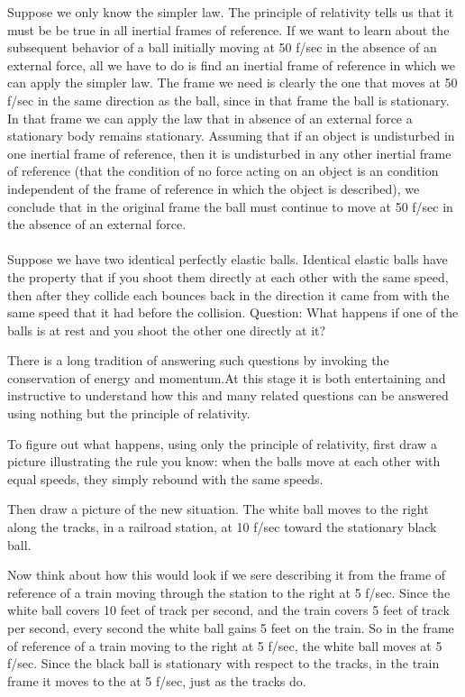 Suppose we only know the simpler law. The principle of relativity tells us that it must be be true in all inertial frames of reference. If we want to learn about the subsequent behavior of a ball initially moving at 50 f/sec in the absence of an external force, all we have to do is find an inertial frame of reference in which we can apply the simpler law. The frame we need is clearly the one that moves at 50 f/sec in the same direction as the ball, since in that frame the ball is stationary. In that frame we can apply the law that in absence of an external force a stationary body remains stationary. Assuming that if an object is undisturbed in one inertial frame of reference, then it is undisturbed in any other inertial frame of reference (that the condition of no force acting on an object is an  condition independent of the frame of reference in which the object is described), we conclude that in the original frame the ball must continue to move at 50 f/sec in the absence of an external force. 
\\\\
Suppose we have two identical perfectly elastic balls. Identical elastic balls have the property that if you shoot them directly at each other with the same speed, then after they collide each bounces back in the direction it came from with the same speed that it had before the collision. Question: What happens if one of the balls is at rest and you shoot the other one directly at it?

There is a long tradition of answering such questions by invoking the conservation of energy and momentum.At this stage it is both entertaining and instructive to understand how this and many related questions can be answered using nothing but the principle of relativity.

To figure out what happens, using only the principle of relativity, first draw a picture illustrating the rule you know: when the balls move at each other with equal speeds, they simply rebound with the same speeds. 

Then draw a picture of the new situation. The white ball moves to the right along the tracks, in a railroad station, at 10 f/sec toward the stationary black ball. 

Now think about how this would look if we sere describing it from the frame of reference of a train moving through the station to the right at 5 f/sec. Since the white ball covers 10 feet of track per second, and the train covers 5 feet of track per second, every second the white ball gains 5 feet on the train. So in the frame of reference of a train moving to the right at 5 f/sec, the white ball moves at 5 f/sec. Since the black ball is stationary with respect to the tracks, in the train frame it moves to the  at 5 f/sec, just as the tracks do. 


